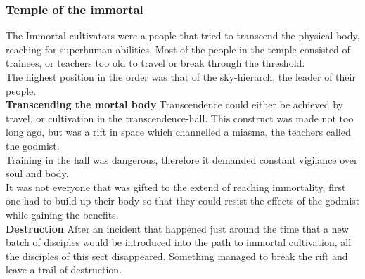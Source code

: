 \documentclass[a4paper]{article}
\begin{document}
\subsubsection{Temple of the immortal}
The Immortal cultivators were a people that tried to transcend the physical body, reaching for superhuman abilities. Most of the people in the temple consisted of trainees, or teachers too old to travel or break through the threshold.
\\
The highest position in the order was that of the sky-hierarch, the leader of their people.
\\
\textbf{Transcending the mortal body}
Transcendence could either be achieved by travel, or cultivation in the transcendence-hall. This construct was made not too long ago, but was a rift in space which channelled a miasma, the teachers called the godmist.
\\ Training in the hall was dangerous, therefore it demanded constant vigilance over soul and body.
\\ It was not everyone that was gifted to the extend of reaching immortality, first one had to build up their body so that they could resist the effects of the godmist while gaining the benefits.
\\
\textbf{Destruction}
After an incident that happened just around the time that a new batch of disciples would be introduced into the path to immortal cultivation, all the disciples of this sect disappeared. Something managed to break the rift and leave a trail of destruction.
\end{document}
